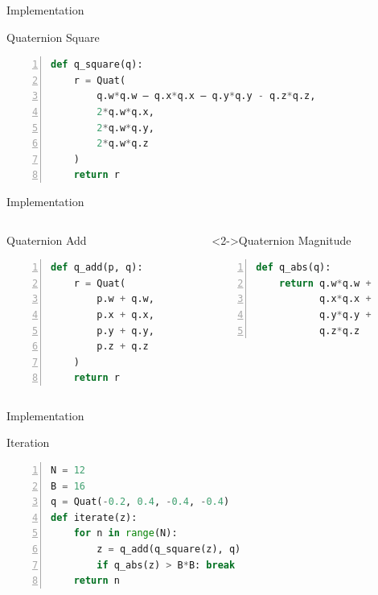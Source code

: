 \documentclass[aspectratio=169,t]{beamer}
\begin{document}
\begin{frame}[label={sec:orgad19de7},fragile]{Implementation}
 \begin{block}{Quaternion Square}
\begin{lstlisting}[language=Python,firstnumber=1,numbers=left]
def q_square(q):
    r = Quat(
        q.w*q.w – q.x*q.x – q.y*q.y - q.z*q.z,
        2*q.w*q.x,
        2*q.w*q.y,
        2*q.w*q.z
    )
    return r
\end{lstlisting}
\end{block}
\end{frame}

\begin{frame}[label={sec:orgbe93d52},fragile]{Implementation}
 \begin{columns}
\begin{column}{0.45\columnwidth}
\begin{block}{Quaternion Add}
\begin{lstlisting}[language=Python,firstnumber=1,numbers=left]
def q_add(p, q):
    r = Quat(
        p.w + q.w,
        p.x + q.x,
        p.y + q.y,
        p.z + q.z
    )
    return r
\end{lstlisting}
\end{block}
\end{column}

\begin{column}{0.45\columnwidth}
\begin{block}<2->{Quaternion Magnitude}
\begin{lstlisting}[language=Python,firstnumber=1,numbers=left]
def q_abs(q):
    return q.w*q.w +
           q.x*q.x +
           q.y*q.y +
           q.z*q.z
\end{lstlisting}
\end{block}
\end{column}
\end{columns}
\end{frame}

\begin{frame}[label={sec:orgca04647},fragile]{Implementation}
 \begin{block}{Iteration}
\begin{lstlisting}[language=Python,firstnumber=1,numbers=left]
N = 12
B = 16
q = Quat(-0.2, 0.4, -0.4, -0.4)
def iterate(z):
    for n in range(N):
        z = q_add(q_square(z), q)
        if q_abs(z) > B*B: break
    return n
\end{lstlisting}
\end{block}
\end{frame}
\end{document}
